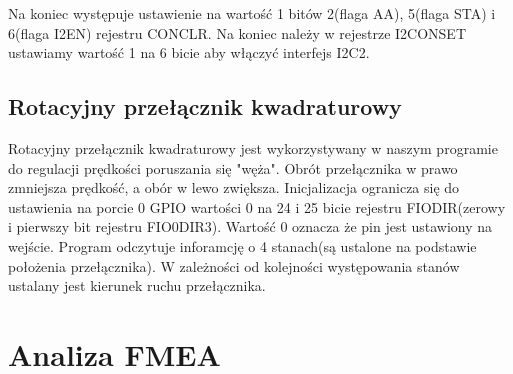 \documentclass{classrep}
\begin{document}
Na koniec występuje ustawienie na wartość 1 bitów 2(flaga AA), 5(flaga STA) i 6(flaga I2EN) rejestru CONCLR.
Na koniec należy w rejestrze I2CONSET ustawiamy wartość 1 na 6 bicie aby włączyć interfejs I2C2. 
\subsection{Rotacyjny przełącznik kwadraturowy}
Rotacyjny przełącznik kwadraturowy jest wykorzystywany w naszym programie do regulacji prędkości poruszania się "węża". Obrót przełącznika w prawo zmniejsza prędkość, a obór w lewo zwiększa. Inicjalizacja ogranicza się do ustawienia na porcie 0 GPIO wartości 0 na 24 i 25 bicie rejestru FIODIR(zerowy i pierwszy bit rejestru FIO0DIR3). Wartość 0 oznacza że pin jest ustawiony na wejście. Program odczytuje inforamcję o 4 stanach(są ustalone na podstawie położenia przełącznika). W zależności od kolejności występowania stanów ustalany jest kierunek ruchu przełącznika.
	\section{Analiza FMEA}
	



\begin{thebibliography}{abcd}

\end{thebibliography}
\end{document}
